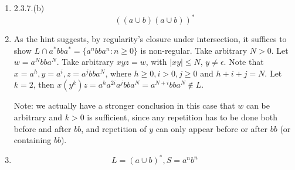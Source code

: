 \documentclass[10pt,a4paper]{article}
\begin{document}
\begin{enumerate}
	\item 2.3.7.(b)
	\[ ((a\cup b)(a\cup b))^* \]
	\item \par
	As the hint suggests, by regularity's closure under intersection, it suffices to show $L\cap a^*bba^*=\{a^nbba^n:n\ge 0\}$ is non-regular. Take arbitrary $N>0$. Let $w=a^Nbba^N$. Take arbitrary $xyz=w$, with $|xy|\le N$, $y\neq\epsilon$. Note that $x=a^h,y=a^i,z=a^jbba^N$, where $h\ge 0,i>0,j\ge 0$ and $h+i+j=N$. Let $k=2$, then $x(y^k)z=a^ha^{2i}a^jbba^N=a^{N+i}bba^N\notin L$.\par
	Note: we actually have a stronger conclusion in this case that $w$ can be arbitrary and $k>0$ is sufficient, since any repetition has to be done both before and after $bb$, and repetition of $y$ can only appear before or after $bb$ (or containing $bb$).
	\item \par
	\[ L=(a\cup b)^*,S={a^nb^n} \]
\end{enumerate}
\end{document}
